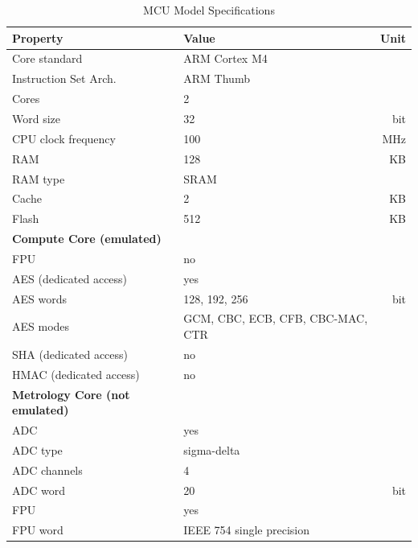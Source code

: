 \documentclass[english]{tudscrartcl}
\begin{document}
				\begin{table}[ht]
					\centering
					\begin{tabularx}{\textwidth}{|l|Y|r|}
						\hline
						\textbf{Property} & \textbf{Value} & \textbf{Unit} \\
						\hline
						Core standard & ARM Cortex M4 & \\
						\hline
						Instruction Set Arch. & ARM Thumb & \\
						\hline
						Cores & 2 &  \\
						\hline
						Word size & 32 & bit \\
						\hline
						\ac{CPU} clock frequency & 100 & MHz \\
						\hline
						RAM & 128 & KB \\
						\hline
						RAM type & SRAM & \\
						\hline
						Cache & 2 & KB \\
						\hline
						Flash & 512 & KB \\
						\hline
						\textbf{Compute Core (emulated)} & & \\
						\hline
						FPU & no & \\
						\hline
						AES (dedicated access) & yes & \\
						\hline
						AES words & 128, 192, 256 & bit \\
						\hline
						AES modes & GCM, CBC, ECB, CFB, CBC-MAC, CTR & \\
						\hline
						SHA (dedicated access) & no & \\
						\hline
						HMAC (dedicated access) & no & \\
						\hline
						\textbf{Metrology Core (not emulated)} & & \\
						\hline
						ADC & yes & \\
						\hline
						ADC type & sigma-delta & \\
						\hline
						ADC channels & 4 & \\
						\hline
						ADC word & 20 & bit \\
						\hline
						FPU & yes & \\
						\hline
						FPU word & IEEE 754 single precision & \\
						\hline
					\end{tabularx}
					\caption{MCU Model Specifications}
					\label{tab:sm_mcu_model_specs}
				\end{table}
				\noindent
\end{document}
